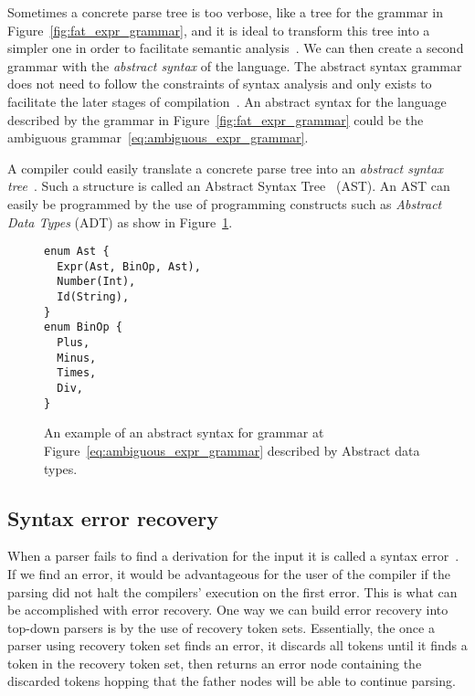 \documentclass[
  oneside,
  english,
  coorientadorbanca,
  embeddedlogo,
  noabntexcite
]{ufsc-thesis-rn46-2019}
\begin{document}
Sometimes a concrete parse tree is too verbose, like a tree for the grammar in Figure~\ref{fig:fat_expr_grammar}, and it is ideal to transform this tree into a simpler one in order to facilitate semantic analysis~\cite{appel2003modern}.
We can then create a second grammar with the \textit{abstract syntax} of the language.
The abstract syntax grammar does not need to follow the constraints of syntax analysis and only exists to facilitate the later stages of compilation~\cite{appel2003modern}.
An abstract syntax for the language described by the grammar in Figure~\ref{fig:fat_expr_grammar} could be the ambiguous grammar~\eqref{eq:ambiguous_expr_grammar}.

A compiler could easily translate a concrete parse tree into an \textit{abstract syntax tree}~\cite{appel2003modern}.
Such a structure is called an Abstract Syntax Tree~\cite{appel2003modern} (AST).
An AST can easily be programmed by the use of programming constructs such as \textit{Abstract Data Types} (ADT) as show in Figure~\ref{fig:abstract_syntax_adt}.

\begin{figure}[ht]
  \centering
  \begin{minipage}{0.6\textwidth}
    \begin{verbatim}
enum Ast {
  Expr(Ast, BinOp, Ast),
  Number(Int),
  Id(String),
}
enum BinOp {
  Plus,
  Minus,
  Times,
  Div,
}
    \end{verbatim}
  \end{minipage}
  \caption{
    An example of an abstract syntax for grammar at Figure~\eqref{eq:ambiguous_expr_grammar} described by Abstract data types.
  }\label{fig:abstract_syntax_adt}
\end{figure}

\subsection{Syntax error recovery}

When a parser fails to find a derivation for the input it is called a syntax error~\cite{appel2003modern}.
If we find an error, it would be advantageous for the user of the compiler if the parsing did not halt the compilers' execution on the first error.
This is what can be accomplished with error recovery.
One way we can build error recovery into top-down parsers is by the use of recovery token sets.
Essentially, the once a parser using recovery token set finds an error, it discards all tokens until it finds a token in the recovery token set, then returns an error node containing the discarded tokens hopping that the father nodes will be able to continue parsing.
\end{document}
